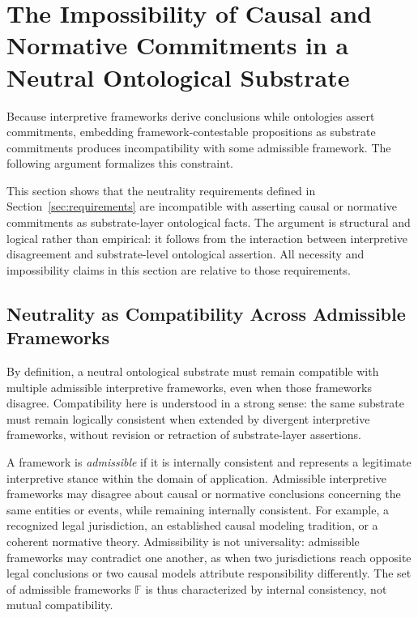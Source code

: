 
\section{The Impossibility of Causal and Normative Commitments in a Neutral Ontological Substrate}
\label{sec:impossibility}

Because interpretive frameworks derive conclusions
while ontologies assert commitments,
embedding framework-contestable propositions as substrate commitments
produces incompatibility with some admissible framework.
The following argument formalizes this constraint.

This section shows that the neutrality requirements
defined in Section~\ref{sec:requirements}
are incompatible with asserting causal or normative commitments
as substrate-layer ontological facts.
The argument is structural and logical rather than empirical:
it follows from the interaction
between interpretive disagreement and substrate-level ontological assertion.
All necessity and impossibility claims in this section
are relative to those requirements.

\subsection{Neutrality as Compatibility Across Admissible Frameworks}

By definition, a neutral ontological substrate must remain compatible
with multiple admissible interpretive frameworks,
even when those frameworks disagree.
Compatibility here is understood in a strong sense:
the same substrate must remain logically consistent
when extended by divergent interpretive frameworks,
without revision or retraction of substrate-layer assertions.

A framework is \emph{admissible} if it is internally consistent and
represents a legitimate interpretive stance
within the domain of application.
Admissible interpretive frameworks may disagree about
causal or normative conclusions concerning the same entities or events,
while remaining internally consistent.
For example,
a recognized legal jurisdiction, an established causal modeling tradition,
or a coherent normative theory.
Admissibility is not universality:
admissible frameworks may contradict one another,
as when two jurisdictions reach opposite legal conclusions
or two causal models attribute responsibility differently.
The set of admissible frameworks $\mathbb{F}$ is thus
characterized by internal consistency, not mutual compatibility.

